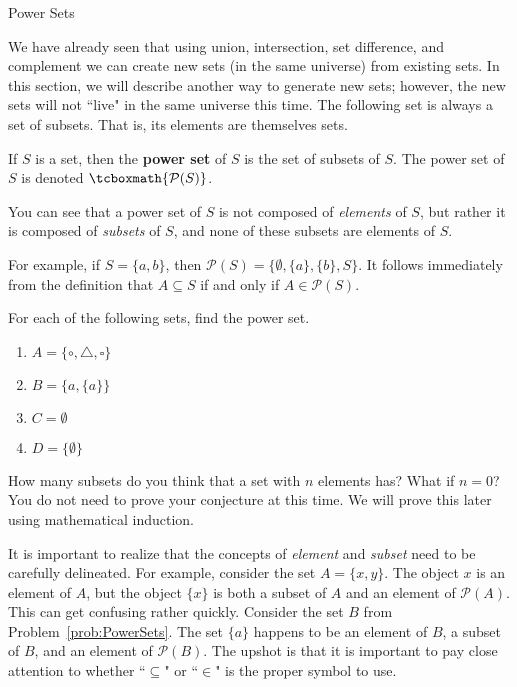 \begin{section}{Power Sets}\label{sec:PowerSets}

We have already seen that using union, intersection, set difference, and complement we can create new sets (in the same universe) from existing sets.  In this section, we will describe another way to generate new sets; however, the new sets will not ``live" in the same universe this time. The following set is always a set of subsets. That is, its elements are themselves sets.

\begin{definition}
If $S$ is a set, then the \textbf{power set} of $S$ is the set of subsets of $S$.  The power set of $S$ is denoted $\tcboxmath{\mathcal{P}(S)}$.
\end{definition}

You can see that a power set of $S$ is not composed of \emph{elements} of $S$, but rather it is composed of \emph{subsets} of $S$, and none of these subsets are elements of $S$.

For example, if $S=\{a,b\}$, then $\mathcal{P}(S)=\{\emptyset, \{a\}, \{b\}, S\}$. It follows immediately from the definition that $A\subseteq S$ if and only if $A\in\mathcal{P}(S)$. 
 
\begin{problem}\label{prob:PowerSets}
For each of the following sets, find the power set.
\begin{multicols}{2}
\begin{enumerate}[label=\textrm{(\alph*)}]
\item $A=\{\circ, \triangle, \square\}$
\item $B=\{a,\{a\}\}$
\item $C=\emptyset$
\item $D=\{\emptyset\}$
\end{enumerate}
\end{multicols}
\end{problem}

\begin{problem}\label{conjecture:PowerSets}
How many subsets do you think that a set with $n$ elements has?  What if $n=0$?  You do not need to prove your conjecture at this time.  We will prove this later using mathematical induction.
\end{problem}

It is important to realize that the concepts of \emph{element} and \emph{subset} need to be carefully delineated.  For example, consider the set $A=\{x,y\}$.  The object $x$ is an element of $A$, but the object $\{x\}$ is both a subset of $A$ and an element of $\mathcal{P}(A)$.  This can get confusing rather quickly.  Consider the set $B$ from Problem~\ref{prob:PowerSets}.  The set $\{a\}$ happens to be an element of $B$, a subset of $B$, and an element of  $\mathcal{P}(B)$. The upshot is that it is important to pay close attention to whether ``$\subseteq$" or ``$\in$" is the proper symbol to use.


\end{section}
